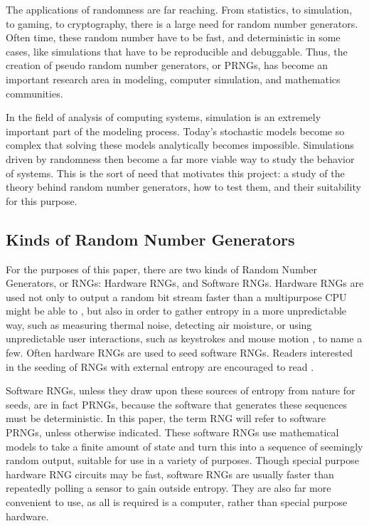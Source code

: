 The applications of randomness are far reaching. From statistics, to simulation, to gaming, to cryptography, there is a large need for random number generators. Often time, these random number have to be fast, and deterministic in some cases, like simulations that have to be reproducible and debuggable. Thus, the creation of pseudo random number generators, or PRNGs, has become an important research area in modeling, computer simulation, and mathematics communities.

In the field of analysis of computing systems, simulation is an extremely important part of the modeling process. Today's stochastic models become so complex that solving these models analytically becomes impossible. Simulations driven by randomness then become a far more viable way to study the behavior of systems. This is the sort of need that motivates this project: a study of the theory behind random number generators, how to test them, and their suitability for this purpose.

\subsection{Kinds of Random Number Generators}
For the purposes of this paper, there are two kinds of Random Number Generators, or RNGs: Hardware RNGs, and Software RNGs. Hardware RNGs are used not only to output a random bit stream faster than a multipurpose CPU might be able to \cite{Saiprasert:2010:OHA:1857927.1857929,Barel:1983:FHR:800042.801454}, but also in order to gather entropy in a more unpredictable way, such as measuring thermal noise, detecting air moisture, or using unpredictable user interactions, such as keystrokes and mouse motion , to name a few. Often hardware RNGs are used to seed software RNGs. Readers interested in the seeding of RNGs with external entropy are encouraged to read \cite{Hennebert:2013:EHP:2462096.2462122}.

Software RNGs, unless they draw upon these sources of entropy from nature for seeds, are in fact PRNGs, because the software that generates these sequences must be deterministic. In this paper, the term RNG will refer to software PRNGs, unless otherwise indicated. These software RNGs use mathematical models to take a finite amount of state and turn this into a sequence of seemingly random output, suitable for use in a variety of purposes. Though special purpose hardware RNG circuits may be fast, software RNGs are usually faster than repeatedly polling a sensor to gain outside entropy. They are also far more convenient to use, as all is required is a computer, rather than special purpose hardware.

